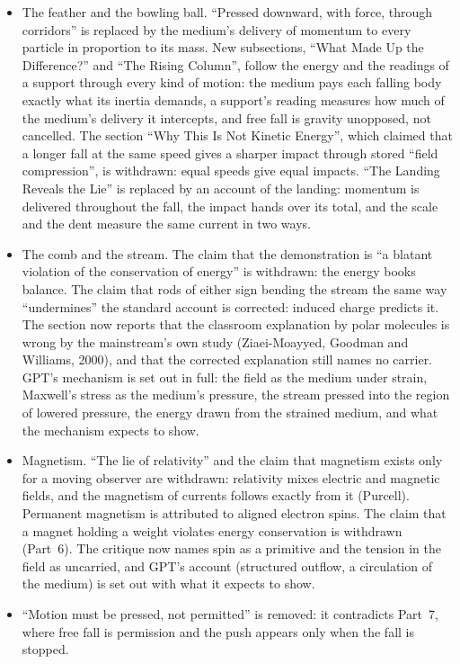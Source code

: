 \documentclass[11pt,a4paper]{article}
\begin{document}
\begin{itemize}
  \item The feather and the bowling ball. ``Pressed downward, with force, through corridors'' is replaced by the medium's delivery of momentum to every particle in proportion to its mass. New subsections, ``What Made Up the Difference?'' and ``The Rising Column'', follow the energy and the readings of a support through every kind of motion: the medium pays each falling body exactly what its inertia demands, a support's reading measures how much of the medium's delivery it intercepts, and free fall is gravity unopposed, not cancelled. The section ``Why This Is Not Kinetic Energy'', which claimed that a longer fall at the same speed gives a sharper impact through stored ``field compression'', is withdrawn: equal speeds give equal impacts. ``The Landing Reveals the Lie'' is replaced by an account of the landing: momentum is delivered throughout the fall, the impact hands over its total, and the scale and the dent measure the same current in two ways.
  \item The comb and the stream. The claim that the demonstration is ``a blatant violation of the conservation of energy'' is withdrawn: the energy books balance. The claim that rods of either sign bending the stream the same way ``undermines'' the standard account is corrected: induced charge predicts it. The section now reports that the classroom explanation by polar molecules is wrong by the mainstream's own study (Ziaei-Moayyed, Goodman and Williams, 2000), and that the corrected explanation still names no carrier. GPT's mechanism is set out in full: the field as the medium under strain, Maxwell's stress as the medium's pressure, the stream pressed into the region of lowered pressure, the energy drawn from the strained medium, and what the mechanism expects to show.
  \item Magnetism. ``The lie of relativity'' and the claim that magnetism exists only for a moving observer are withdrawn: relativity mixes electric and magnetic fields, and the magnetism of currents follows exactly from it (Purcell). Permanent magnetism is attributed to aligned electron spins. The claim that a magnet holding a weight violates energy conservation is withdrawn (Part~6). The critique now names spin as a primitive and the tension in the field as uncarried, and GPT's account (structured outflow, a circulation of the medium) is set out with what it expects to show.
  \item ``Motion must be pressed, not permitted'' is removed: it contradicts Part~7, where free fall is permission and the push appears only when the fall is stopped.
\end{itemize}
\end{document}
